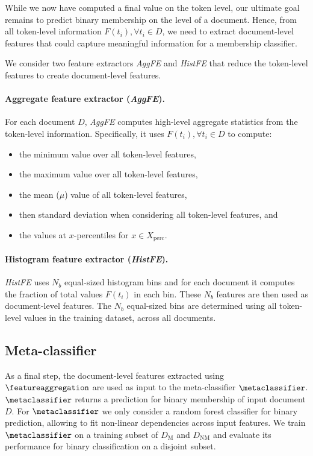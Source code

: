 \documentclass[twocolumn,10pt]{article}
\begin{document}
While we now have computed a final value on the token level, our ultimate goal remains to predict binary membership on the level of a document. Hence, from all token-level information $F(t_i), \forall t_i \in D$, we need to extract document-level features that could capture meaningful information for a membership classifier.

We consider two feature extractors \textit{AggFE} and \textit{HistFE} that reduce the token-level features to create document-level features.

\paragraph{\textbf{Aggregate feature extractor (\textit{AggFE}).}} For each document $D$, \textit{AggFE} computes high-level aggregate statistics from the token-level information. Specifically, it uses $F(t_i), \forall t_i \in D$ to compute:

\begin{itemize}
    \item the minimum value over all token-level features,
    \item the maximum value over all token-level features,
    \item the mean ($\mu$) value of all token-level features,
    \item then standard deviation when considering all token-level features, and
    \item the values at $x$-percentiles for $x \in X_\text{perc}$.  
\end{itemize}

\paragraph{\textbf{Histogram feature extractor (\textit{HistFE}).}} \textit{HistFE} uses $N_b$ equal-sized histogram bins and for each document it computes the fraction of total values $F(t_i)$ in each bin. These $N_b$ features are then used as document-level features. The $N_b$ equal-sized bins are determined using all token-level values in the training dataset, across all documents. 

\subsection{Meta-classifier}

As a final step, the document-level features extracted using $\featureaggregation$ are used as input to the meta-classifier $\metaclassifier$. $\metaclassifier$ returns a prediction for binary membership of input document $D$. For $\metaclassifier$ we only consider a random forest classifier for binary prediction, allowing to fit non-linear dependencies across input features. We train $\metaclassifier$ on a training subset of $D_{\text{M}}$ and $D_{\text{NM}}$ and evaluate its performance for binary classification on a disjoint subset. 
 \label{sec:methodology}
\end{document}
